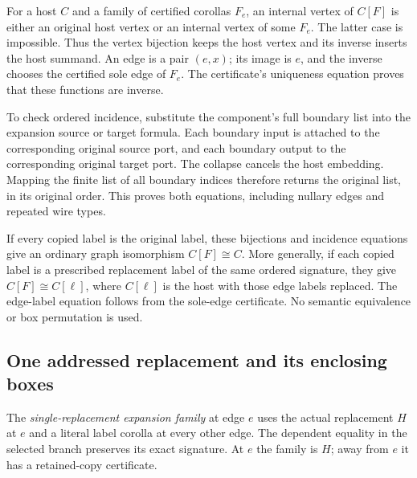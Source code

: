 
For a host $C$ and a family of certified corollas $F_e$, an internal vertex of
$C[F]$ is either an original host vertex or an internal vertex of some $F_e$.
The latter case is impossible. Thus the vertex bijection keeps the host
vertex and its inverse inserts the host summand. An edge is a pair $(e,x)$;
its image is $e$, and the inverse chooses the certified sole edge of $F_e$.
The certificate's uniqueness equation proves that these functions are inverse.


To check ordered incidence, substitute the component's full boundary list
into the expansion source or target formula. Each boundary input is attached
to the corresponding original source port, and each boundary output to the
corresponding original target port. The collapse cancels the host embedding.
Mapping the finite list of all boundary indices therefore returns the
original list, in its original order. This proves both equations, including
nullary edges and repeated wire types.


If every copied label is the original label, these bijections and incidence
equations give an ordinary graph isomorphism $C[F]\cong C$. More generally,
if each copied label is a prescribed replacement label of the same ordered
signature, they give $C[F]\cong C[\ell]$, where $C[\ell]$ is the host with
those edge labels replaced. The edge-label equation follows from the sole-edge
certificate. No semantic equivalence or box permutation is used.


\subsection{One addressed replacement and its enclosing boxes}
The \emph{single-replacement expansion family} at edge $e$ uses the actual
replacement $H$ at $e$ and a literal label corolla at every other edge.
The dependent equality in the selected branch preserves its exact signature.
At $e$ the family is $H$; away from $e$ it has a retained-copy certificate.

